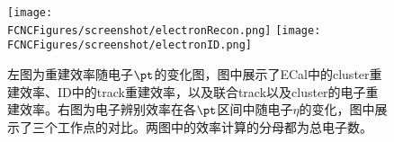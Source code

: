 \begin{figure}[H]
\centering
\texttt{[image: \\FCNCFigures/screenshot/electronRecon.png]}
\texttt{[image: \\FCNCFigures/screenshot/electronID.png]}
\caption{左图为重建效率随电子$\pt$的变化图，图中展示了ECal中的cluster重建效率、ID中的track重建效率，以及联合track以及cluster的电子重建效率。右图为电子辨别效率在各$\pt$区间中随电子$\eta$的变化，图中展示了三个工作点的对比。两图中的效率计算的分母都为总电子数。}
\label{fig:electronRecon}
\end{figure}